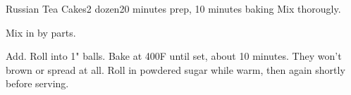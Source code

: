\documentclass[../Cookbook.tex]{subfiles}
\begin{document}
\begin{recipe}[RussianTeaCakes]{Russian Tea Cakes}{2 dozen}{20 minutes prep, 10 minutes baking}
Mix thorougly.

Mix in by parts.

Add.
Roll into 1" balls.
Bake at 400\0F until set, about 10 minutes.
They won't brown or spread at all.
Roll in powdered sugar while warm, then again shortly before serving.

\end{recipe}
\end{document}
